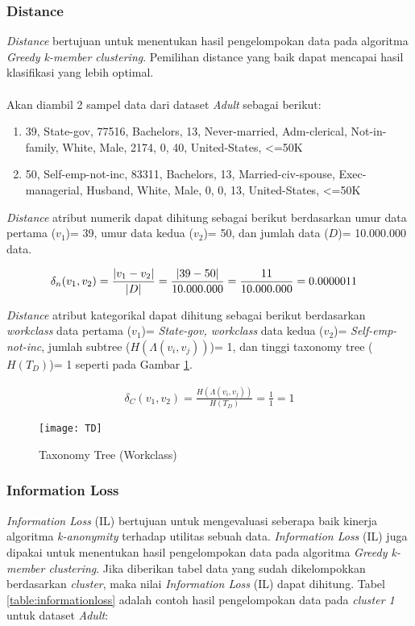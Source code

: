 \subsubsection{Distance}
\textit{Distance} bertujuan untuk menentukan hasil pengelompokan data pada algoritma \textit{Greedy k-member clustering}. Pemilihan distance yang baik dapat mencapai hasil klasifikasi yang lebih optimal.
\\\\
\noindent Akan diambil 2 sampel data dari dataset \textit{Adult} sebagai berikut:
\begin{enumerate}
\item 39, State-gov, 77516, Bachelors, 13, Never-married, Adm-clerical, Not-in-family, White, Male, 2174, 0, 40, United-States, <=50K
\item 50, Self-emp-not-inc, 83311, Bachelors, 13, Married-civ-spouse, Exec-managerial, Husband, White, Male, 0, 0, 13, United-States, <=50K
\end{enumerate}

\noindent \textit{Distance} atribut numerik dapat dihitung sebagai berikut berdasarkan umur data pertama ($v_1$)= 39, umur data kedua ($v_2$)= 50, dan jumlah data ($D$)= 10.000.000 data.


\begin{align*}
\delta_n(v_1,v_2) &= \frac{|v_1 - v_2|}{|D|}
= \frac{|39 - 50|}{10.000.000}\vspace{0.2cm}
= \frac{11}{10.000.000}\vspace{0.2cm}
= 0.0000011
\end{align*}

\noindent \textit{Distance} atribut kategorikal dapat dihitung sebagai berikut berdasarkan \textit{workclass} data pertama ($v_1$)= \textit{State-gov, workclass} data kedua ($v_2$)= \textit{Self-emp-not-inc}, jumlah subtree ($H(\Lambda(v_i,v_j))$)= 1, dan tinggi taxonomy tree ($H(T_D)$)= 1  seperti pada Gambar \ref{fig:TD}.

\begin{align*}
\delta_C(v_1,v_2) = \frac{H(\Lambda(v_i,v_j))}{H(T_D)} 
= \frac{1}{1}
= 1
\end{align*}

\begin{figure}[H]
	\centering
	\texttt{[image: TD]}
	\caption{Taxonomy Tree (Workclass)}
	\label{fig:TD}
\end{figure}

\subsubsection{Information Loss}
\textit{Information Loss} (IL) bertujuan untuk mengevaluasi seberapa baik kinerja algoritma \textit{k-anonymity} terhadap utilitas sebuah data. \textit{Information Loss} (IL) juga dipakai untuk menentukan hasil pengelompokan data pada algoritma \textit{Greedy k-member clustering}. Jika diberikan tabel data yang sudah dikelompokkan berdasarkan \textit{cluster}, maka nilai \textit{Information Loss} (IL) dapat dihitung. Tabel  \ref{table:informationloss} adalah contoh hasil pengelompokan data pada \textit{cluster 1} untuk dataset \textit{Adult}:

